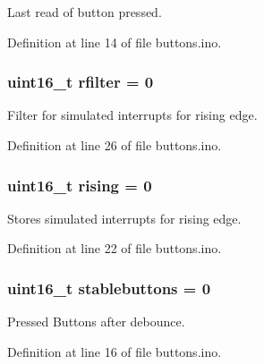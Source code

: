 Last read of button pressed. 



Definition at line 14 of file buttons.\+ino.

\subsubsection[{\texorpdfstring{rfilter}{rfilter}}]{\setlength{\rightskip}{0pt plus 5cm}uint16\+\_\+t rfilter = 0}\hypertarget{group__buttons_ga541db091bf54e0a51180f3666e5a2ce2}{}\label{group__buttons_ga541db091bf54e0a51180f3666e5a2ce2}


Filter for simulated interrupts for rising edge. 



Definition at line 26 of file buttons.\+ino.

\subsubsection[{\texorpdfstring{rising}{rising}}]{\setlength{\rightskip}{0pt plus 5cm}uint16\+\_\+t rising = 0}\hypertarget{group__buttons_gacc4c256fa5e75c09f1b3a669d45485ec}{}\label{group__buttons_gacc4c256fa5e75c09f1b3a669d45485ec}


Stores simulated interrupts for rising edge. 



Definition at line 22 of file buttons.\+ino.

\subsubsection[{\texorpdfstring{stablebuttons}{stablebuttons}}]{\setlength{\rightskip}{0pt plus 5cm}uint16\+\_\+t stablebuttons = 0}\hypertarget{group__buttons_gaca8bc953fb5340b58c9403b3bf8bbd8e}{}\label{group__buttons_gaca8bc953fb5340b58c9403b3bf8bbd8e}


Pressed Buttons after debounce. 



Definition at line 16 of file buttons.\+ino.


